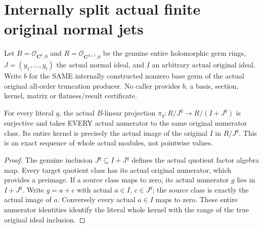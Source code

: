 \section{Internally split actual finite original normal jets}
Let $B=\mathcal O_{\mathbf C^d,0}$ and $R=\mathcal O_{\mathbf C^{d+t},0}$
be the genuine entire holomorphic germ rings, $J=(y_1,\ldots,y_t)$ the
actual normal ideal, and $I$ an arbitrary actual original ideal.
Write $b$ for the SAME internally constructed nonzero base germ of the
actual original all-order truncation producer. No caller provides $b$,
a basis, section, kernel, matrix or flatness/result certificate.

\begin{theorem}
\label{hir:relative-normal-finite-jet-original-projection}
\leanok
{}
For every literal $q$, the actual $B$-linear projection
$\pi_q:R/J^q\to R/(I+J^q)$ is surjective and takes EVERY actual numerator
to the same original numerator class. Its entire kernel is precisely
the actual image of the original $I$ in $R/J^q$. This is an exact
sequence of whole actual modules, not pointwise values.
\end{theorem}
\begin{proof}
The genuine inclusion $J^q\subseteq I+J^q$ defines the actual quotient
factor algebra map. Every target quotient class has its actual original
numerator, which provides a preimage. If a source class maps to zero,
its actual numerator $g$ lies in $I+J^q$. Write $g=a+c$ with actual
$a\in I$, $c\in J^q$; the source class is exactly the actual image of $a$.
Conversely every actual $a\in I$ maps to zero. These entire numerator
identities identify the literal whole kernel with the range of the
true original ideal inclusion.
\end{proof}

